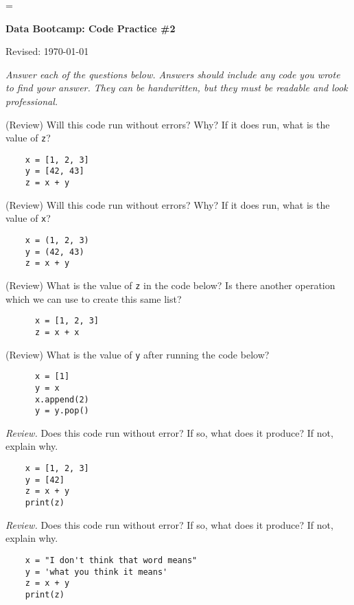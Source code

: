 \documentclass[11pt]{exam}
\begin{document}
\parskip=\bigskipamount
\parindent=0.0in
\thispagestyle{empty}


\bigskip\bigskip
\centerline{\Large \bf Data Bootcamp:  Code Practice \#2}
\centerline{Revised: \today}

{\it Answer each of the questions below.
Answers should include any code you wrote to find your answer.
They can be handwritten, but they must be readable and look professional.}

\begin{questions}

  \item (Review) Will this code run without errors? Why? If it does run, what is the value of \texttt{z}?
    \begin{verbatim}
    x = [1, 2, 3]
    y = [42, 43]
    z = x + y
    \end{verbatim}

  \item (Review) Will this code run without errors? Why? If it does run, what is the value of \texttt{x}?
    \begin{verbatim}
    x = (1, 2, 3)
    y = (42, 43)
    z = x + y
    \end{verbatim}

  \item (Review) What is the value of \texttt{z} in the code below? Is there another operation which we can use to create this same list?
    \begin{verbatim}
      x = [1, 2, 3]
      z = x + x
    \end{verbatim}

  \item (Review) What is the value of \texttt{y} after running the code below?
    \begin{verbatim}
      x = [1]
      y = x
      x.append(2)
      y = y.pop()
    \end{verbatim}

  \item {\it Review.\/}
    Does this code run without error?  If so, what does it produce?  If not, explain why.
    \begin{verbatim}
    x = [1, 2, 3]
    y = [42]
    z = x + y
    print(z)
    \end{verbatim}

  \item {\it Review.\/}
    Does this code run without error?  If so, what does it produce?  If not, explain why.
    \begin{verbatim}
    x = "I don't think that word means"
    y = 'what you think it means'
    z = x + y
    print(z)
    \end{verbatim}


\end{questions}
\end{document}
